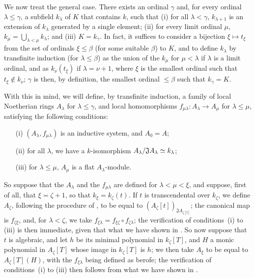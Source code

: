 \begin{env}[10.3.1.4]
\label{0.10.3.1.4}
We now treat the general case.
There exists an ordinal $\gamma$ and, for every ordinal $\lambda\leq\gamma$, a subfield $k_\lambda$ of $K$ that contains $k$, such that (i) for all $\lambda<\gamma$, $k_{\lambda+1}$ is an extension of $k_\lambda$ generated by a single element; (ii) for every limit ordinal $\mu$, $k_\mu=\bigcup_{\lambda<\mu}k_\lambda$; and (iii) $K=k_\gamma$.
In fact, it suffices to consider a bijection $\xi\mapsto t_\xi$ from the set of ordinals $\xi\leq\beta$ (for some suitable $\beta$) to $K$, and to define $k_\lambda$ by transfinite induction (for $\lambda\leq\beta$) as the union of the $k_\mu$ for $\mu<\lambda$ if $\lambda$ is a limit ordinal, and as $k_\nu(t_\xi)$ if $\lambda=\nu+1$, where $\xi$ is the smallest ordinal such that $t_\xi\not\in k_\nu$;
$\gamma$ is then, by definition, the smallest ordinal $\leq\beta$ such that $k_\gamma=K$.

With this in mind, we will define, by transfinite induction, a family of local Noetherian rings $A_\lambda$ for $\lambda\leq\gamma$, and local homomorphisms $f_{\mu\lambda}:A_\lambda\to A_\mu$ for $\lambda\leq\mu$, satisfying the following conditions:
\begin{enumerate}
  \item[(i)] $(A_\lambda,f_{\mu\lambda})$ is an inductive system, and $A_0=A$;
  \item[(ii)] for all $\lambda$, we have a $k$-isomorphism $A_\lambda/\mathfrak{J}A_\lambda\simeq k_\lambda$;
  \item[(iii)] for $\lambda\leq\mu$, $A_\mu$ is a flat $A_\lambda$-module.
\end{enumerate}

So suppose that the $A_\lambda$ and the $f_{\mu\lambda}$ are defined for $\lambda<\mu<\xi$, and suppose, first of all, that $\xi=\zeta+1$, so that $k_\xi=k_\zeta(t)$.
If $t$ is transcendental over $k_\zeta$, we define $A_\zeta$, following the procedure of , to be equal to $(A_\zeta[t])_{\mathfrak{J}A_{\zeta[t]}}$;
the canonical map is $f_{\zeta\xi}$, and, for $\lambda<\zeta$, we take $f_{\xi\lambda}=f_{\xi\zeta}\circ f_{\zeta\lambda}$;
the verification of conditions~(i) to (iii) is then immediate, given that what we have shown in .
So now suppose that $t$ is algebraic, and let $h$ be its minimal polynomial in $k_\zeta[T]$, and $H$ a monic polynomial in $A_\zeta[T]$ whose image in $k_\zeta[T]$ is $h$;
we then take $A_\xi$ to be equal to $A_\zeta[T](H)$, with the $f_{\xi\lambda}$ being defined as berofe;
the verification of conditions~(i) to (iii) then follows from what we have shown in .


\end{env}
